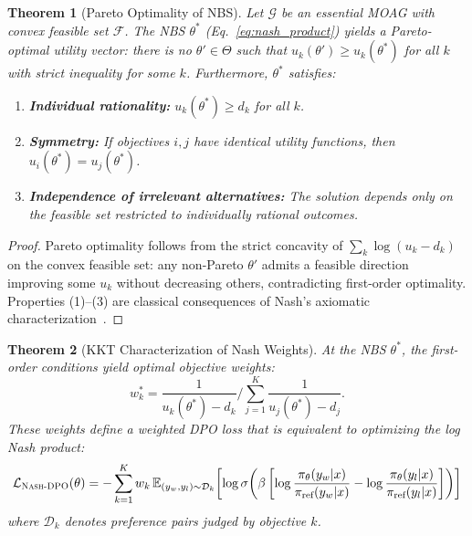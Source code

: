 \documentclass{article}
\newtheorem{theorem}{Theorem}
\newcommand{\piref}{\pi_{\text{ref}}}
\newcommand{\EE}{\mathbb{E}}
\newcommand{\NashDPO}{\textsc{Nash-DPO}}
\begin{document}
\begin{theorem}[Pareto Optimality of NBS]
\label{thm:pareto}
Let $\mathcal{G}$ be an essential MOAG with convex feasible set $\mathcal{F}$. The NBS $\theta^*$ (Eq.~\ref{eq:nash_product}) yields a Pareto-optimal utility vector: there is no $\theta' \in \Theta$ such that $u_k(\theta') \geq u_k(\theta^*)$ for all $k$ with strict inequality for some $k$.
Furthermore, $\theta^*$ satisfies:
\begin{enumerate}
    \item \textbf{Individual rationality:} $u_k(\theta^*) \geq d_k$ for all $k$.
    \item \textbf{Symmetry:} If objectives $i, j$ have identical utility functions, then $u_i(\theta^*) = u_j(\theta^*)$.
    \item \textbf{Independence of irrelevant alternatives:} The solution depends only on the feasible set restricted to individually rational outcomes.
\end{enumerate}
\end{theorem}

\begin{proof}
Pareto optimality follows from the strict concavity of $\sum_k \log(u_k - d_k)$ on the convex feasible set: any non-Pareto $\theta'$ admits a feasible direction improving some $u_k$ without decreasing others, contradicting first-order optimality.
Properties (1)--(3) are classical consequences of Nash's axiomatic characterization~\citep{nash1950bargaining,nash1953two}.
\end{proof}

\begin{theorem}[KKT Characterization of Nash Weights]
\label{thm:kkt}
At the NBS $\theta^*$, the first-order conditions yield optimal objective weights:
\begin{equation}
w_k^* = \frac{1}{u_k(\theta^*) - d_k} \bigg/ \sum_{j=1}^K \frac{1}{u_j(\theta^*) - d_j}.
\label{eq:kkt_weights}
\end{equation}
These weights define a weighted DPO loss that is equivalent to optimizing the log Nash product:
\begin{equation}
\mathcal{L}_{\NashDPO{}}(\theta) = -\sum_{k=1}^K w_k \,\EE_{(y_w, y_l) \sim \mathcal{D}_k}\!\left[\log\sigma\!\left(\beta\left[\log\frac{\pi_\theta(y_w|x)}{\piref(y_w|x)} - \log\frac{\pi_\theta(y_l|x)}{\piref(y_l|x)}\right]\right)\right]
\label{eq:nash_dpo_loss}
\end{equation}
where $\mathcal{D}_k$ denotes preference pairs judged by objective $k$.
\end{theorem}
\end{document}

